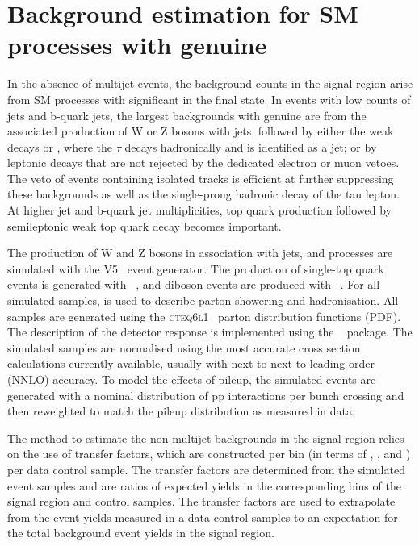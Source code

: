\section{Background estimation for SM processes with genuine \ETmiss}
\label{sec:ewk_background}

In the absence of multijet events, the background counts in the signal
region arise from SM processes with significant \ETmiss in the final
state. In events with low counts of jets and b-quark jets, the largest
backgrounds with genuine \ETmiss are from the associated production of
W or Z bosons with jets, followed by either the weak decays \znunu or
\wtaunu, where the $\tau$ decays hadronically and is identified as a
jet; or by leptonic decays that are not rejected by the dedicated
electron or muon vetoes. The veto of events containing isolated tracks
is efficient at further suppressing these backgrounds as well as the
single-prong hadronic decay of the tau lepton. At higher jet and
b-quark jet multiplicities, top quark production followed by
semileptonic weak top quark decay becomes important.

The production of W and Z bosons in association with jets, \ttbar and
\gj processes are simulated with the \MADGRAPH V5~\cite{madgraph}
event generator. The production of single-top quark events is
generated with \POWHEG~\cite{powheg}, and diboson events are produced
with ~\cite{pythia8}. For all simulated samples, 
is used to describe parton showering and hadronisation. All samples
are generated using the \textsc{cteq6l1}~\cite{Pumplin:2002vw} parton
distribution functions (PDF). The description of the detector response
is implemented using the \GEANTfour~\cite{geant} package. The
simulated samples are normalised using the most accurate cross section
calculations currently available, usually with
next-to-next-to-leading-order (NNLO) accuracy. To model the effects of
pileup, the simulated events are generated with a nominal distribution
of pp interactions per bunch crossing and then reweighted to match the
pileup distribution as measured in data.

The method to estimate the non-multijet backgrounds in the signal
region relies on the use of transfer factors, which are constructed
per bin (in terms of \njet, \nb, and \scalht) per data control
sample. The transfer factors are determined from the simulated event
samples and are ratios of expected yields in the corresponding bins of
the signal region and control samples. The transfer factors are used
to extrapolate from the event yields measured in a data control
samples to an expectation for the total background event yields in the
signal region.

